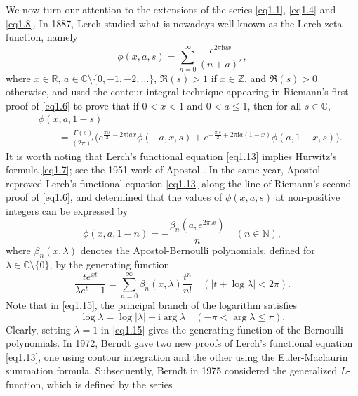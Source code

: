 \documentclass[reqno]{amsart}
\numberwithin{equation}{section}
\begin{document}
We now turn our attention to the extensions of the series \eqref{eq1.1}, \eqref{eq1.4} and \eqref{eq1.8}. In 1887, Lerch \cite{lerch} studied what is nowadays well-known as the Lerch zeta-function, namely
\begin{equation}\label{eq1.12}
\phi(x,a,s)=\sum_{n=0}^{\infty}\frac{e^{2\pi \mathrm{i}nx}}{(n+a)^{s}},
\end{equation}
where $x\in\mathbb{R}$, $a\in\mathbb{C}\setminus\{0,-1,-2,\ldots\}$, $\Re(s)>1$ if $x\in\mathbb{Z}$, and $\Re(s)>0$ otherwise, and used the contour integral
technique appearing in Riemann's first proof of \eqref{eq1.6} to prove that
if $0<x<1$ and $0<a\leqslant1$, then for all $s\in\mathbb{C}$,
\begin{eqnarray}\label{eq1.13}
&&\phi(x,a,1-s)\nonumber\\
&&\qquad=\frac{\Gamma(s)}{(2\pi)^{s}}\bigl(e^{\frac{\pi \mathrm{i}s}{2}-2\pi\mathrm{i}ax}\phi(-a,x,s)+e^{-\frac{\pi \mathrm{i}s}{2}+2\pi\mathrm{i}a(1-x)}\phi(a,1-x,s)\bigl).
\end{eqnarray}
It is worth noting that Lerch's functional equation \eqref{eq1.13} implies Hurwitz's formula \eqref{eq1.7}; see the 1951 work of Apostol \cite{apostol1}. In the same year, Apostol \cite{apostol2} reproved Lerch's functional equation \eqref{eq1.13} along the line of Riemann's second proof of \eqref{eq1.6}, and determined that the values of $\phi(x,a,s)$ at non-positive integers can be expressed by
\begin{equation}\label{eq1.14}
\phi(x,a,1-n)=-\frac{\beta_{n}(a,e^{2\pi \mathrm{i}x})}{n}\quad(n\in\mathbb{N}),
\end{equation}
where $\beta_{n}(x,\lambda)$ denotes the Apostol-Bernoulli polynomials, defined for $\lambda\in\mathbb{C}\setminus\{0\}$, by the generating function
\begin{equation}  \label{eq1.15}
\frac{te^{xt}}{\lambda e^{t}-1}=\sum_{n=0}^{\infty}
\beta_{n}(x,\lambda)\frac{t^{n}}{n!}\quad(|t+\log\lambda|<2\pi).
\end{equation}
Note that in \eqref{eq1.15}, the principal branch of the logarithm satisfies
\begin{equation*}
\log \lambda=\log|\lambda|+\mathrm{i}\arg \lambda \quad(-\pi<\arg \lambda\leqslant\pi).
\end{equation*}
Clearly, setting $\lambda=1$ in \eqref{eq1.15} gives the generating function of the Bernoulli polynomials. In 1972, Berndt \cite{berndt2} gave two new proofs of Lerch's functional equation \eqref{eq1.13}, one using contour integration and the other using the Euler-Maclaurin summation formula. Subsequently, Berndt \cite{berndt3} in 1975 considered the generalized $L$-function, which is defined by the series
\end{document}
